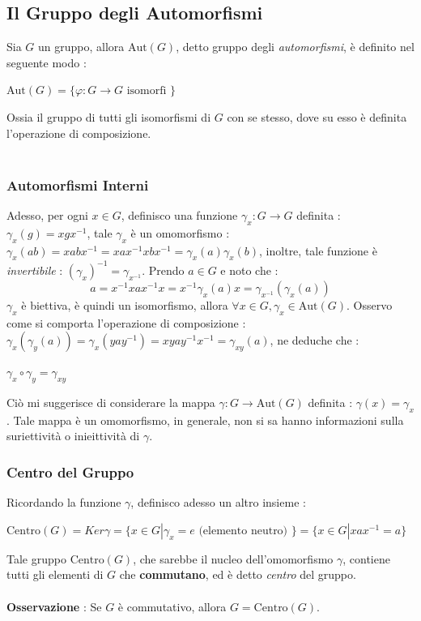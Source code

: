 \documentclass[12pt, letterpaper]{article}
\newcommand{\aut}{{\text{Aut}}}
\newcommand{\cen}{{\text{Centro}}}
\begin{document}
\subsection{Il Gruppo degli Automorfismi} \label{automorfismi}
Sia \(G\) un gruppo, allora \(\aut(G)\), detto gruppo degli \textit{automorfismi}, è definito nel seguente modo :
\begin{center}\( \aut(G)=\{\varphi : G\rightarrow G \text{ isomorfi }\} \)\end{center}
Ossia il gruppo di tutti gli isomorfismi di \(G\) con se stesso, dove su esso è definita l'operazione di 
composizione.\\\hphantom{}\\
\subsubsection{Automorfismi Interni}
Adesso, per ogni \(x\in G\), definisco una funzione \(\gamma_x : G\rightarrow G\) definita : \(\gamma_x(g)=xgx^{-1}\), 
tale \(\gamma_x\) è un omomorfismo : \(\gamma_x(ab)=xabx^{-1}=xax^{-1}xbx^{-1}=\gamma_x(a)\gamma_x(b)\), inoltre, tale funzione 
è \textit{invertibile} : \((\gamma_x)^{-1}=\gamma_{x^{-1}}\). Prendo \(a\in G\) e noto che : \begin{equation}
a=x^{-1}xax^{-1}x=x^{-1}\gamma_x(a)x=\gamma_{x^{-1}}(\gamma_x(a))
\end{equation}
\(\gamma_x\) è biettiva, è quindi un isomorfismo, allora \(\forall x\in G, \gamma_x \in \aut(G)\). Osservo 
come si comporta l'operazione di composizione : \(\gamma_x(\gamma_y(a))=\gamma_x(yay^{-1})=xyay^{-1}x^{-1}=\gamma_{xy}(a)\), ne deduche che :
\begin{center}
    \(\gamma_x\circ \gamma_y = \gamma_{xy}\)
\end{center}
Ciò mi suggerisce di considerare la mappa \(\gamma : G\rightarrow \aut(G)\) definita : \(\gamma(x)=\gamma_x\). Tale 
mappa è un omomorfismo, in generale, non si sa hanno informazioni sulla suriettività o inieittività di \(\gamma\). 
\subsubsection{Centro del Gruppo}
Ricordando la funzione \(\gamma\), definisco adesso un altro insieme :\begin{center}
    \(
    \cen(G)=Ker\gamma = \{x\in G|\gamma_x = e \text{ (elemento neutro) }\}=\{x\in G|xax^{-1}=a\}    
    \)
\end{center}
Tale gruppo \(\cen(G)\), che sarebbe il nucleo dell'omomorfismo \(\gamma\),
contiene tutti gli elementi di \(G\) che \textbf{commutano}, ed è detto \textit{centro} del 
gruppo.\\\hphantom{}\\        
\textbf{Osservazione }: Se \(G\) è commutativo, allora \(G=\cen(G)\).
\end{document}
